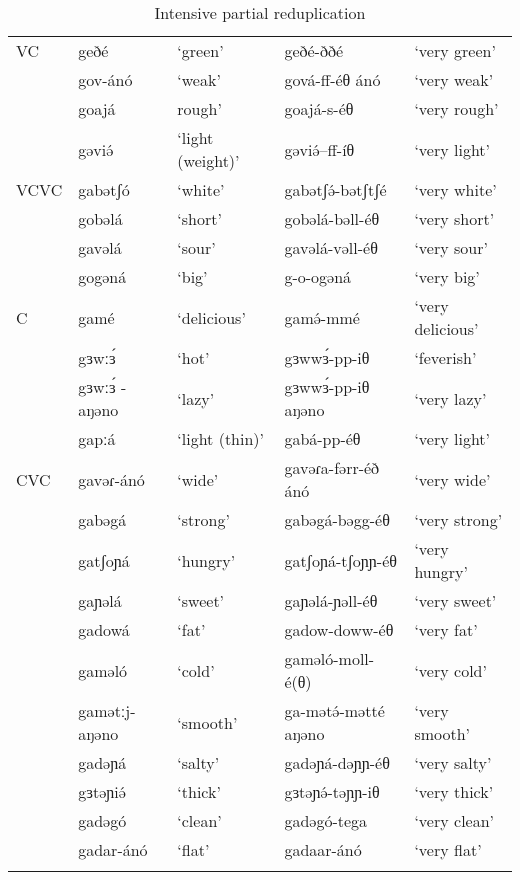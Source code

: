 \begin{table}
\begin{tabular}{lllll}
\lsptoprule
VC&	geðé	&	‘green’	&	geðé-ððé		&	`very green' \\
&	gov-ánó	&	‘weak’	&	gová-ff-éθ ánó	&	‘very weak’\\
&	goajá	&	rough’	&	goajá-s-éθ		&	‘very rough’\\
&	gəviə́	&	‘light (weight)’&	gəviə́--ff-íθ	&	‘very light’\\
\midrule
VCVC&	gabətʃó &	‘white’&	gabətʃə́-bətʃtʃé	&	`very white' \\
&	gobəlá	&	‘short’	&	gobəlá-bəll-éθ	&	‘very short’ \\
&	gavəlá	&	‘sour’	&	gavəlá-vəll-éθ	&	‘very sour’\\
&	gogəná	&	‘big’	&	g-o-ogəná		&	‘very big’\\
\midrule
C&	gamé	&	‘delicious’&	gamə́-mmé		&	‘very delicious’\\
&	gɜwːɜ́	&	‘hot’	&	gɜwwɜ́-pp-iθ		&	‘feverish’\\ %
&	gɜwːɜ́ -aŋəno&	‘lazy’&	gɜwwɜ́-pp-iθ aŋəno	&	‘very lazy’\\
&	gapːá	&	‘light (thin)’&	gabá-pp-éθ	&	‘very light’\\
\midrule
CVC&	gavəɾ-ánó 	&	‘wide’&	gavəɾa-fərr-éð ánó	&	‘very wide’\\
&	gabəgá	&	‘strong’&	gabəgá-bəgg-éθ	&	‘very strong’\\
&	gatʃoɲá	&	‘hungry’&	gatʃoɲá-tʃoɲɲ-éθ	&	‘very hungry’\\
&	gaɲəlá	&	‘sweet’	&	gaɲəlá-ɲəll-éθ	&	‘very sweet’\\
&	gadowá	&	‘fat’	&	gadow-doww-éθ	&	‘very fat’\\
&	gaməló	&	‘cold’	&	gaməló-moll-é(θ)	&	‘very cold’\\
&	gamətːj-aŋəno &	‘smooth’&	ga-mətə́-mətté aŋəno	&	‘very smooth’\\
&	gadəɲá	&	‘salty’	&	gadəɲá-dəɲɲ-éθ	&	‘very salty’\\
&	gɜtəɲiə́	&	‘thick’	&	gɜtəɲə́-təɲɲ-iθ	&	‘very thick’\\
&	gadəgó	&	‘clean’	&	gadəgó-tega	&	‘very clean’\\
&	gadar-ánó&	‘flat’	&	gadaar-ánó	&	‘very flat’\\
\lspbottomrule
\end{tabular}	
\caption{Intensive partial reduplication}
\label{tab:ch10:1}
\end{table}

